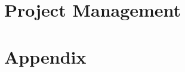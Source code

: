 \documentclass[11pt]{article}
\begin{document}
\section{Project Management}

\section{Appendix}

\begin{thebibliography}{9}

\end{thebibliography}
\end{document}
